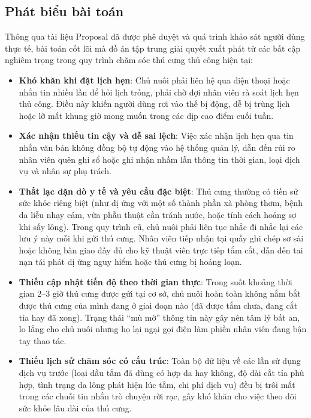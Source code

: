 \subsection{Phát biểu bài toán}
Thông qua tài liệu Proposal đã được phê duyệt và quá trình khảo sát người dùng thực tế, bài toán cốt lõi mà đồ án tập trung giải quyết xuất phát từ các bất cập nghiêm trọng trong quy trình chăm sóc thú cưng thủ công hiện tại:
\begin{itemize}
    \item \textbf{Khó khăn khi đặt lịch hẹn}: Chủ nuôi phải liên hệ qua điện thoại hoặc nhắn tin nhiều lần để hỏi lịch trống, phải chờ đợi nhân viên rà soát lịch hẹn thủ công. Điều này khiến người dùng rơi vào thế bị động, dễ bị trùng lịch hoặc lỡ mất khung giờ mong muốn trong các dịp cao điểm cuối tuần.
    \item \textbf{Xác nhận thiếu tin cậy và dễ sai lệch}: Việc xác nhận lịch hẹn qua tin nhắn văn bản không đồng bộ tự động vào hệ thống quản lý, dẫn đến rủi ro nhân viên quên ghi sổ hoặc ghi nhận nhầm lẫn thông tin thời gian, loại dịch vụ và nhân sự phụ trách.
    \item \textbf{Thất lạc dặn dò y tế và yêu cầu đặc biệt}: Thú cưng thường có tiền sử sức khỏe riêng biệt (như dị ứng với một số thành phần xà phòng thơm, bệnh da liễu nhạy cảm, vừa phẫu thuật cần tránh nước, hoặc tính cách hoảng sợ khi sấy lông). Trong quy trình cũ, chủ nuôi phải liên tục nhắc đi nhắc lại các lưu ý này mỗi khi gửi thú cưng. Nhân viên tiếp nhận tại quầy ghi chép sơ sài hoặc không bàn giao đầy đủ cho kỹ thuật viên trực tiếp tắm cắt, dẫn đến tai nạn tái phát dị ứng nguy hiểm hoặc thú cưng bị hoảng loạn.
    \item \textbf{Thiếu cập nhật tiến độ theo thời gian thực}: Trong suốt khoảng thời gian 2--3 giờ thú cưng được gửi tại cơ sở, chủ nuôi hoàn toàn không nắm bắt được thú cưng của mình đang ở giai đoạn nào (đã được tắm chưa, đang cắt tỉa hay đã xong). Trạng thái ``mù mờ'' thông tin này gây nên tâm lý bất an, lo lắng cho chủ nuôi nhưng họ lại ngại gọi điện làm phiền nhân viên đang bận tay thao tác.
    \item \textbf{Thiếu lịch sử chăm sóc có cấu trúc}: Toàn bộ dữ liệu về các lần sử dụng dịch vụ trước (loại dầu tắm đã dùng có hợp da hay không, độ dài cắt tỉa phù hợp, tình trạng da lông phát hiện lúc tắm, chi phí dịch vụ) đều bị trôi mất trong các chuỗi tin nhắn trò chuyện rời rạc, gây khó khăn cho việc theo dõi sức khỏe lâu dài của thú cưng.
\end{itemize}

